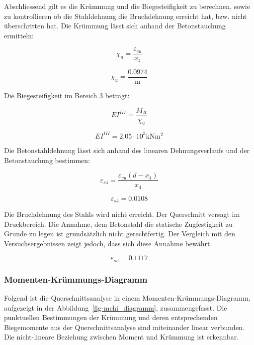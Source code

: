 \documentclass[
  12pt,
  letterpaper,
  egregdoesnotlikesansseriftitles]{scrreprt}
\begin{document}
Abschliessend gilt es die Krümmung und die Biegesteifigkeit zu
berechnen, sowie zu kontrollieren ob die Stahldehnung die Bruchdehnung
erreicht hat, bzw. nicht überschritten hat. Die Krümmung lässt sich
anhand der Betonstauchung ermitteln:

\begin{equation}\chi_{u} = \frac{\varepsilon_{cu}}{x_{4}}\end{equation}

\begin{equation}\chi_{u} = \frac{0.0974}{\text{m}}\end{equation}

Die Biegesteifigkeit im Bereich 3 beträgt:

\begin{equation}EI^{III} = \frac{M_{R}}{\chi_{u}}\end{equation}

\begin{equation}EI^{III} = 2.05 \cdot 10^{3} \text{kN} \text{m}^{2}\end{equation}

Die Betonstahldehnung lässt sich anhand des linearen Dehnungsverlaufs
und der Betonstauchung bestimmen:

\begin{equation}\varepsilon_{s4} = \frac{\varepsilon_{cu} \left(d - x_{4}\right)}{x_{4}}\end{equation}

\begin{equation}\varepsilon_{s4} = 0.0108\end{equation}

Die Bruchdehnung des Stahls wird nicht erreicht. Der Querschnitt versagt
im Druckbereich. Die Annahme, dem Betonstahl die statische Zugfestigkeit
zu Grunde zu legen ist grundsätzlich nicht gerechtfertig. Der Vergleich
mit den Versuchsergebnissen zeigt jedoch, dass sich diese Annahme
bewährt.

\begin{equation}\varepsilon_{su} = 0.1117\end{equation}

\subsubsection{Momenten-Krümmungs-Diagramm}\label{momenten-kruxfcmmungs-diagramm}

Folgend ist die Querschnittsanalyse in einem
Momenten-Krümmungs-Diagramm, aufgezeigt in der
Abbildung~\ref{fig-mchi_diagramm}, zusammengefasst. Die punktuellen
Bestimmungen der Krümmung und deren entsprechenden Biegemomente aus der
Querschnittsanalyse sind miteinander linear verbunden. Die nicht-lineare
Beziehung zwischen Moment und Krümmung ist erkennbar.
\end{document}
